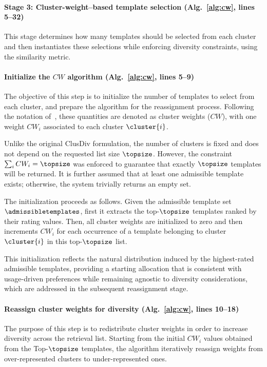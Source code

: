 \paragraph{Stage 3: Cluster-weight--based template selection (Alg.~\ref{alg:cw}, lines 5--32)}

This stage determines how many templates should be selected from each cluster and then instantiates these selections while enforcing diversity constraints, using the similarity metric.

\paragraph{Initialize the $CW$ algorithm (Alg.~\ref{alg:cw}, lines 5--9)} 
The objective of this step is to initialize the number of templates to select from each cluster, and prepare the algorithm for the reassignment process. Following the notation of~\cite{clusdiv}, these quantities are denoted as cluster weights ($CW$), with one weight $CW_i$ associated to each cluster $\cluster{i}$.

Unlike the original ClusDiv formulation, the number of clusters is fixed and does not depend on the requested list size $\topsize$. However, the constraint $\sum_i CW_i = \topsize$ was enforced to guarantee that exactly $\topsize$ templates will be returned. It is further assumed that at least one admissible template exists; otherwise, the system trivially returns an empty set.

The initialization proceeds as follows. Given the admissible template set $\admissibletemplates$, first it extracts the top-$\topsize$ templates ranked by their rating values. Then, all cluster weights are initialized to zero and then increments $CW_i$ for each occurrence of a template belonging to cluster $\cluster{i}$ in this top-$\topsize$ list.

This initialization reflects the natural distribution induced by the highest-rated admissible templates, providing a starting allocation that is consistent with usage-driven preferences while remaining agnostic to diversity considerations, which are addressed in the subsequent reassignment stage.

\paragraph{Reassign cluster weights for diversity (Alg.~\ref{alg:cw}, lines 10--18)}
The purpose of this step is to redistribute cluster weights in order to increase diversity across the retrieval list.
Starting from the initial $CW_i$ values obtained from the Top-$\topsize$ templates, the algorithm iteratively reassign weights from over-represented clusters to under-represented ones.

